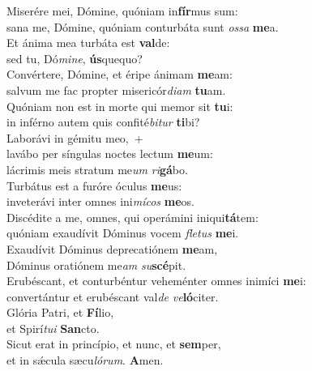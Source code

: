 \evenverse Miserére mei, Dómine, quóniam in\textbf{fír}mus sum:~\*\\
\evenverse sana me, Dómine, quóniam conturbáta sunt \textit{os}\textit{sa} \textbf{me}a.\\
\oddverse Et ánima mea turbáta est \textbf{val}de:~\*\\
\oddverse sed tu, Dó\textit{mi}\textit{ne}, \textbf{ús}quequo?\\
\evenverse Convértere, Dómine, et éripe ánimam \textbf{me}am:~\*\\
\evenverse salvum me fac propter misericór\textit{di}\textit{am} \textbf{tu}am.\\
\oddverse Quóniam non est in morte qui memor sit \textbf{tu}i:~\*\\
\oddverse in inférno autem quis confité\textit{bi}\textit{tur} \textbf{ti}bi?\\
\evenverse Laborávi in gémitu meo,~+\\
\evenverse  lavábo per síngulas noctes lectum \textbf{me}um:~\*\\
\evenverse lácrimis meis stratum me\textit{um} \textit{ri}\textbf{gá}bo.\\
\oddverse Turbátus est a furóre óculus \textbf{me}us:~\*\\
\oddverse inveterávi inter omnes ini\textit{mí}\textit{cos} \textbf{me}os.\\
\evenverse Discédite a me, omnes, qui operámini iniqui\textbf{tá}tem:~\*\\
\evenverse quóniam exaudívit Dóminus vocem \textit{fle}\textit{tus} \textbf{me}i.\\
\oddverse Exaudívit Dóminus deprecatiónem \textbf{me}am,~\*\\
\oddverse Dóminus oratiónem me\textit{am} \textit{su}\textbf{scé}pit.\\
\evenverse Erubéscant, et conturbéntur veheménter omnes inimíci \textbf{me}i:~\*\\
\evenverse convertántur et erubéscant val\textit{de} \textit{ve}\textbf{ló}citer.\\
\oddverse Glória Patri, et \textbf{Fí}lio,~\*\\
\oddverse et Spirí\textit{tu}\textit{i} \textbf{San}cto.\\
\evenverse Sicut erat in princípio, et nunc, et \textbf{sem}per,~\*\\
\evenverse et in sǽcula sæcu\textit{ló}\textit{rum}. \textbf{A}men.\\

